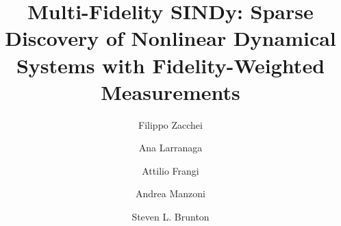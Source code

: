 \documentclass[final,3p,10.5pt]{elsarticle}
\begin{document}
\begin{frontmatter}

\title{Multi-Fidelity SINDy: Sparse Discovery of Nonlinear Dynamical Systems with Fidelity-Weighted Measurements}


\author[aff1]{Filippo Zacchei}

\author[aff2]{Ana Larranaga}

\author[aff3]{Attilio Frangi}

\author[aff1]{Andrea Manzoni}

\author[aff4]{Steven L. Brunton}

\address[aff1]{Politecnico di Milano, MOX - Dept. of Mathematics, p.za Leonardo da Vinci, 32, Milano, 20133, Italy}
\address[aff2]{AI Institute in Dynamic Systems, University of Washington, Seattle, USA}
\address[aff3]{Politecnico di Milano, Dept. of Civil and Environmental Engineering, p.za Leonardo da Vinci, 32, Milano, 20133, Italy}
\address[aff4]{Department of Mechanical Engineering, University of Washington, Seattle, Washington 98195, USA}





\end{frontmatter}

\end{document}
